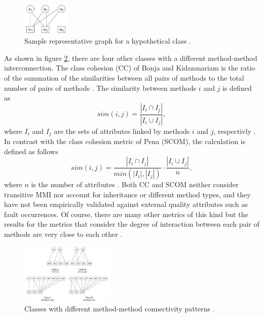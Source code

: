 \begin{figure}[htbp]
	\centerline{\includegraphics[width=0.2\textwidth]{pictures/am.png}}
	\caption{Sample representative graph for a hypothetical class \cite{b3al2012fault}.}
	\label{fig1}
\end{figure}

As shown in figure \ref{fig2}, there are four other classes with a different method-method interconnection. The class cohesion (CC) of Bonja and Kidanmariam is the ratio of the summation of the similarities between all pairs of methods to the total number of pairs of methods \cite{bonja2006metrics}. The similarity between methods $i$ and $j$ is defined as
\begin{displaymath}
	sim(i,j)=\frac{|I_i \cap I_j|}{|I_i \cup I_j|} ,  
\end{displaymath}
where $I_i$ and $I_j$ are the sets of attributes linked by methods $i$ and $j$, respectivly \cite{b3al2012fault}. In contrast with the class cohesion metric of Pena (SCOM), the calculation is defined as follows
\begin{displaymath}
	sim(i,j)=\frac{|I_i \cap I_j|}{min(|I_i|, |I_j|)} \cdot \frac{|I_i \cup I_j|}{n},  
\end{displaymath}
where $n$ is the number of attributes \cite{fernandez2006sensitive}.
Both CC and SCOM neither consider transitive MMI nor account for inheritance or different method types, and they have not been empirically validated against external quality attributes such as fault occurrences. Of course, there are many other metrics of this kind but the results for the metrics that consider the degree of interaction between each pair of methods are very close to each other \cite{b8al2012precise}.

\begin{figure}[htbp]
	\centerline{\includegraphics[width=0.4\textwidth]{pictures/am2.png}}
	\caption{Classes with different method-method connectivity patterns \cite{b3al2012fault}.}
	\label{fig2}
\end{figure}

